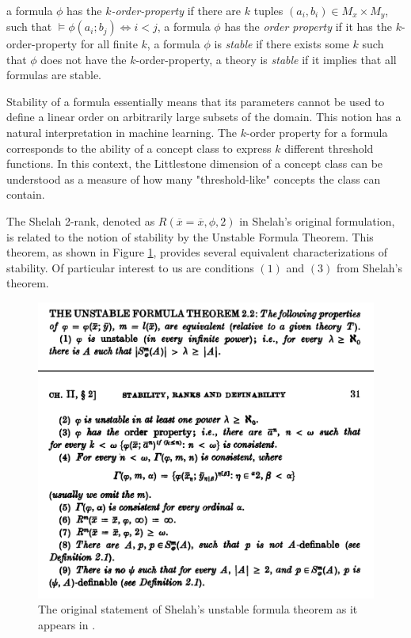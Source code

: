 \begin{definition}[Stability]
\label{def:stable}
~
\begin{outline}
    \1 a formula $\phi$ has the \emph{$k$-order-property} if there are $k$ tuples $(a_i,b_i)\in M_x\times M_y$, such that $\models\phi(a_i;b_j) \iff i<j$,
    \1 a formula $\phi$ has the \emph{order property} if it has the $k$-order-property for all finite $k$,
    \1 a formula $\phi$ is \emph{stable} if there exists some $k$ such that $\phi$ does not have the $k$-order-property,
    \1 a theory is \emph{stable} if it implies that all formulas are stable.
\end{outline}
\end{definition}

\begin{remark}
    Stability of a formula essentially means that its parameters cannot be used to define a linear order on arbitrarily large subsets of the domain. This notion has a natural interpretation in machine learning. The $k$-order property for a formula corresponds to the ability of a concept class to express $k$ different threshold functions. In this context, the Littlestone dimension of a concept class can be understood as a measure of how many "threshold-like" concepts the class can contain. 
\end{remark}

The Shelah 2-rank, denoted as $R(\overline{x}=\overline{x},\phi,2)$ in Shelah's original formulation, is related to the notion of stability by the Unstable Formula Theorem. This theorem, as shown in Figure \ref{fig:origStatement}, provides several equivalent characterizations of stability. Of particular interest to us are conditions $(1)$ and $(3)$ from Shelah's theorem.

\begin{figure}
    \centering
    \includegraphics[width=\linewidth]{ShelahUnstable.png}
    \caption{The original statement of Shelah’s unstable formula theorem as it appears in \cite{Shelah1990}.}
    \label{fig:origStatement}
\end{figure}


